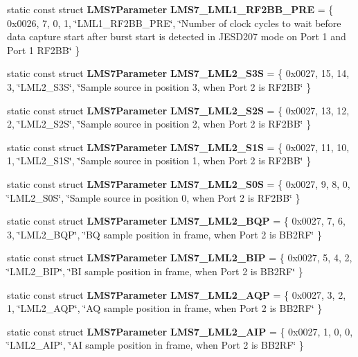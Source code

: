 \begin{DoxyCompactItemize}
\item 
static const struct {\bf L\+M\+S7\+Parameter} {\bf L\+M\+S7\+\_\+\+L\+M\+L1\+\_\+\+R\+F2\+B\+B\+\_\+\+P\+RE} = \{ 0x0026, 7, 0, 1, \char`\"{}\+L\+M\+L1\+\_\+\+R\+F2\+B\+B\+\_\+\+P\+R\+E\char`\"{}, \char`\"{}\+Number of clock cycles to wait before data capture start after burst start is detected in J\+E\+S\+D207 mode on Port 1 and Port 1 R\+F2\+B\+B\char`\"{} \}
\item 
static const struct {\bf L\+M\+S7\+Parameter} {\bf L\+M\+S7\+\_\+\+L\+M\+L2\+\_\+\+S3S} = \{ 0x0027, 15, 14, 3, \char`\"{}\+L\+M\+L2\+\_\+\+S3\+S\char`\"{}, \char`\"{}\+Sample source in position 3, when Port 2 is R\+F2\+B\+B\char`\"{} \}
\item 
static const struct {\bf L\+M\+S7\+Parameter} {\bf L\+M\+S7\+\_\+\+L\+M\+L2\+\_\+\+S2S} = \{ 0x0027, 13, 12, 2, \char`\"{}\+L\+M\+L2\+\_\+\+S2\+S\char`\"{}, \char`\"{}\+Sample source in position 2, when Port 2 is R\+F2\+B\+B\char`\"{} \}
\item 
static const struct {\bf L\+M\+S7\+Parameter} {\bf L\+M\+S7\+\_\+\+L\+M\+L2\+\_\+\+S1S} = \{ 0x0027, 11, 10, 1, \char`\"{}\+L\+M\+L2\+\_\+\+S1\+S\char`\"{}, \char`\"{}\+Sample source in position 1, when Port 2 is R\+F2\+B\+B\char`\"{} \}
\item 
static const struct {\bf L\+M\+S7\+Parameter} {\bf L\+M\+S7\+\_\+\+L\+M\+L2\+\_\+\+S0S} = \{ 0x0027, 9, 8, 0, \char`\"{}\+L\+M\+L2\+\_\+\+S0\+S\char`\"{}, \char`\"{}\+Sample source in position 0, when Port 2 is R\+F2\+B\+B\char`\"{} \}
\item 
static const struct {\bf L\+M\+S7\+Parameter} {\bf L\+M\+S7\+\_\+\+L\+M\+L2\+\_\+\+B\+QP} = \{ 0x0027, 7, 6, 3, \char`\"{}\+L\+M\+L2\+\_\+\+B\+Q\+P\char`\"{}, \char`\"{}\+B\+Q sample position in frame, when Port 2 is B\+B2\+R\+F\char`\"{} \}
\item 
static const struct {\bf L\+M\+S7\+Parameter} {\bf L\+M\+S7\+\_\+\+L\+M\+L2\+\_\+\+B\+IP} = \{ 0x0027, 5, 4, 2, \char`\"{}\+L\+M\+L2\+\_\+\+B\+I\+P\char`\"{}, \char`\"{}\+B\+I sample position in frame, when Port 2 is B\+B2\+R\+F\char`\"{} \}
\item 
static const struct {\bf L\+M\+S7\+Parameter} {\bf L\+M\+S7\+\_\+\+L\+M\+L2\+\_\+\+A\+QP} = \{ 0x0027, 3, 2, 1, \char`\"{}\+L\+M\+L2\+\_\+\+A\+Q\+P\char`\"{}, \char`\"{}\+A\+Q sample position in frame, when Port 2 is B\+B2\+R\+F\char`\"{} \}
\item 
static const struct {\bf L\+M\+S7\+Parameter} {\bf L\+M\+S7\+\_\+\+L\+M\+L2\+\_\+\+A\+IP} = \{ 0x0027, 1, 0, 0, \char`\"{}\+L\+M\+L2\+\_\+\+A\+I\+P\char`\"{}, \char`\"{}\+A\+I sample position in frame, when Port 2 is B\+B2\+R\+F\char`\"{} \}

\end{DoxyCompactItemize}
